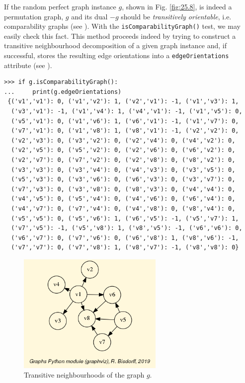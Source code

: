 If the random perfect graph instance $g$, shown in Fig. \ref{fig:25.8}, is indeed a permutation graph, $g$ and its dual $-g$ should be \emph{transitively orientable}, i.e. comparability graphs (see \citet{GOL-2004}). With the \texttt{isComparabilityGraph()} test, we may easily check this fact. This method proceeds indeed by trying to construct a transitive neighbourhood decomposition of a given graph instance and, if successful, stores the resulting edge orientations into a \texttt{edgeOrientations} attribute (see \citet[p.129-132]{GOL-2004}).
\begin{lstlisting}[basicstyle=\scriptsize]
>>> if g.isComparabilityGraph():
...     print(g.edgeOrientations)  
 {('v1','v1'): 0, ('v1','v2'): 1, ('v2','v1'): -1, ('v1','v3'): 1,
  ('v3','v1'): -1, ('v1','v4'): 1, ('v4','v1'): -1, ('v1','v5'): 0,
  ('v5','v1'): 0, ('v1','v6'): 1, ('v6','v1'): -1, ('v1','v7'): 0,
  ('v7','v1'): 0, ('v1','v8'): 1, ('v8','v1'): -1, ('v2','v2'): 0,
  ('v2','v3'): 0, ('v3','v2'): 0, ('v2','v4'): 0, ('v4','v2'): 0,
  ('v2','v5'): 0, ('v5','v2'): 0, ('v2','v6'): 0, ('v6','v2'): 0,
  ('v2','v7'): 0, ('v7','v2'): 0, ('v2','v8'): 0, ('v8','v2'): 0,
  ('v3','v3'): 0, ('v3','v4'): 0, ('v4','v3'): 0, ('v3','v5'): 0,
  ('v5','v3'): 0, ('v3','v6'): 0, ('v6','v3'): 0, ('v3','v7'): 0,
  ('v7','v3'): 0, ('v3','v8'): 0, ('v8','v3'): 0, ('v4','v4'): 0,
  ('v4','v5'): 0, ('v5','v4'): 0, ('v4','v6'): 0, ('v6','v4'): 0,
  ('v4','v7'): 0, ('v7','v4'): 0, ('v4','v8'): 0, ('v8','v4'): 0,
  ('v5','v5'): 0, ('v5','v6'): 1, ('v6','v5'): -1, ('v5','v7'): 1,
  ('v7','v5'): -1, ('v5','v8'): 1, ('v8','v5'): -1, ('v6','v6'): 0,
  ('v6','v7'): 0, ('v7','v6'): 0, ('v6','v8'): 1, ('v8','v6'): -1,
  ('v7','v7'): 0, ('v7','v8'): 1, ('v8','v7'): -1, ('v8','v8'): 0}
\end{lstlisting}		    
\begin{figure}[h]
\sidecaption
\includegraphics[width=7cm]{Figures/transOrientGraph.png}
\caption{Transitive neighbourhoods of the graph $g$.} 
\label{fig:25.9}       %
\end{figure}

